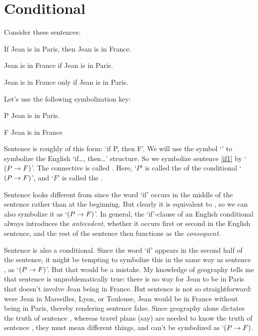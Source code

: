\section{Conditional}
Consider these sentences:
	\begin{earg}
		\item[\ex{if0}] If Jean is in Paris, then Jean is in France.
		\item[\ex{if1}] Jean is in France if Jean is in Paris.
		\item[\ex{if2}] Jean is in France only if Jean is in Paris.
	\end{earg}
Let's use the following symbolization key:
	\begin{ekey}
		\item[P] Jean is in Paris.
		\item[F] Jean is in France
	\end{ekey}
Sentence  is roughly of this form: `if P, then F'. We will use the symbol `\eif' to symbolize the English `if\ldots, then\ldots' structure. So we symbolize sentence \ref{if1} by `$(P\rightarrow F)$'. The connective is called . Here, `$P$' is called the  of the conditional `$(P \rightarrow F)$', and `$F$' is called the .

Sentence  looks different from  since the word `if' occurs in the middle of the sentence rather than at the beginning.  But clearly  it is equivalent to , so we can also symbolize it as `$(P \rightarrow F)$'.  In general, the `if'-clause of an English conditional always introduces the \emph{antecedent}, whether it occurs first or second in the English sentence, and the rest of the sentence then functions as the \emph{consequent}.


Sentence  is also a conditional. Since the word `if' appears in the second half of the sentence, it might be tempting to symbolize this in the same way as sentence , as `$(P \rightarrow F)$'. But that would be a mistake. My knowledge of geography tells me that sentence  is unproblematically true: there is no way for Jean to be in Paris that doesn't involve Jean being in France. But sentence  is not so straightforward: were  Jean in Marseilles, Lyon, or Toulouse, Jean would be in France without being in Paris, thereby rendering sentence  false. Since geography alone dictates the truth of sentence , whereas travel plans (say) are needed to know the truth of sentence , they must mean different things, and  can't be symbolized as `$(P \rightarrow F)$.

